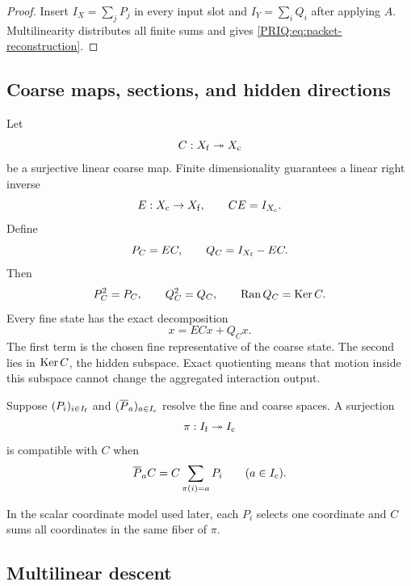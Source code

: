 \begin{proof}
Insert $I_X=\sum_jP_j$ in every input slot and $I_Y=\sum_iQ_i$ after applying $A$.  Multilinearity distributes all finite sums and gives \eqref{PRIQ:eq:packet-reconstruction}.
\end{proof}

\subsection{Coarse maps, sections, and hidden directions}
Let
\[
  C:X_{\mathrm f}\twoheadrightarrow X_{\mathrm c}
\]
be a surjective linear coarse map.  Finite dimensionality guarantees a linear right inverse
\[
  E:X_{\mathrm c}\to X_{\mathrm f},
  \qquad CE=I_{X_{\mathrm c}}.
\]
Define
\begin{equation}\label{PRIQ:eq:representative-hidden-proj}
  P_C=EC,
  \qquad
  Q_C=I_{X_{\mathrm f}}-EC.
\end{equation}
Then
\[
  P_C^2=P_C,
  \qquad
  Q_C^2=Q_C,
  \qquad
  \operatorname{Ran} Q_C=\operatorname{Ker} C.
\]
Every fine state has the exact decomposition
\begin{equation}\label{PRIQ:eq:representative-hidden-decomposition}
  x=ECx+Q_Cx.
\end{equation}
The first term is the chosen fine representative of the coarse state.  The second lies in $\operatorname{Ker} C$, the hidden subspace.  Exact quotienting means that motion inside this subspace cannot change the aggregated interaction output.

\begin{PRIQdefinition}\label{PRIQ:def:packet-aggregation}
Suppose $(P_i)_{i\in I_{\mathrm f}}$ and $(\overline P_a)_{a\in I_{\mathrm c}}$ resolve the fine and coarse spaces.  A surjection
\[
  \pi:I_{\mathrm f}\twoheadrightarrow I_{\mathrm c}
\]
is compatible with $C$ when
\begin{equation}\label{PRIQ:eq:packet-aggregation-compatibility}
  \overline P_aC
  =
  C\sum_{\pi(i)=a}P_i
  \qquad(a\in I_{\mathrm c}).
\end{equation}
\end{PRIQdefinition}

In the scalar coordinate model used later, each $P_i$ selects one coordinate and $C$ sums all coordinates in the same fiber of $\pi$.

\subsection{Multilinear descent}


